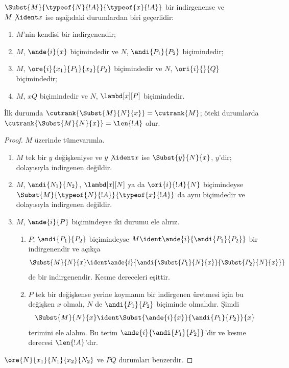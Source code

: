 \documentclass[../../../include/open-logic-section]{subfiles}
\begin{document}
\begin{lem}
  $\Subst{M}{\typeof{N}{!A}}{\typeof{x}{!A}}$ bir indirgenense ve $M
  \not\ident x$ ise aşağıdaki durumlardan biri geçerlidir:
  \begin{enumerate}
  \item $M$'nin kendisi bir indirgenendir;
  \item $M$, $\ande{i}{x}$ biçimindedir ve $N$, $\andi{P_1}{P_2}$
    biçimindedir;
  \item $M$, $\ore{i}{x_1}{P_1}{x_2}{P_2}$ biçimindedir ve $N$,
    $\ori{i}{}{Q}$ biçimindedir;
  \item $M$, $x Q$ biçimindedir ve $N$, $\lambd[x][P]$ biçimindedir.
  \end{enumerate}
  İlk durumda $\cutrank{\Subst{M}{N}{x}} = \cutrank{M}$; öteki
  durumlarda $\cutrank{\Subst{M}{N}{x}} = \len{!A}$ olur.
\end{lem}
\begin{proof}
  $M$ üzerinde tümevarımla.
  \begin{enumerate}
  \item $M$ tek bir $y$ değişkeniyse ve $y \not\ident x$ ise
    $\Subst{y}{N}{x}$, $y$'dir; dolayısıyla indirgenen değildir.
  \item $M$, $\andi{N_1}{N_2}$, $\lambd[x][N]$ ya da
    $\ori{i}{!A}{N}$ biçimindeyse
    $\Subst{M}{\typeof{N}{!A}}{\typeof{x}{!A}}$ da aynı biçimdedir ve
    dolayısıyla indirgenen değildir.
  \item $M$, $\ande{i}{P}$ biçimindeyse iki durumu ele alırız.
    \begin{enumerate}
      \item $P$, $\andi{P_1}{P_2}$ biçimindeyse $M \ident
        \ande{i}{\andi{P_1}{P_2}}$ bir indirgenendir ve açıkça
        \[
        \Subst{M}{N}{x} \ident
        \ande{i}{\andi{\Subst{P_1}{N}{x}}{\Subst{P_2}{N}{x}}}
        \]
        de bir indirgenendir. Kesme dereceleri eşittir.
      \item $P$ tek bir değişkense yerine koymanın bir indirgenen üretmesi
        için bu değişken $x$ olmalı, $N$ de $\andi{P_1}{P_2}$ biçiminde
        olmalıdır. Şimdi
        \[
        \Subst{M}{N}{x} \ident \Subst{\ande{i}{x}}{\andi{P_1}{P_2}}{x}
        \]
        terimini ele alalım. Bu terim
        $\ande{i}{\andi{P_1}{P_2}}$'dir ve kesme derecesi
        $\len{!A}$'dır.
    \end{enumerate}
  \end{enumerate}
  $\ore{N}{x_1}{N_1}{x_2}{N_2}$ ve $P Q$ durumları benzerdir.
\end{proof}
\end{document}
